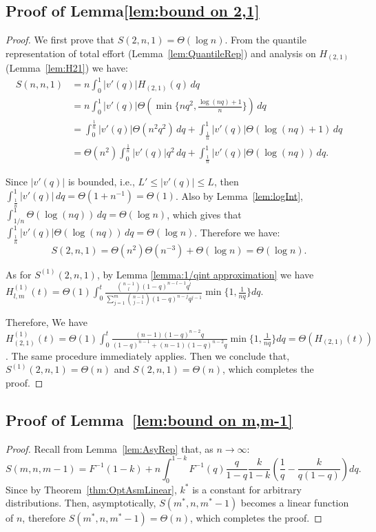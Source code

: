 \subsection*{Proof of Lemma\ref{lem:bound on 2,1}}
\begin{proof}
    We first prove that $S(2,n,1) = \Theta(\log n).$ From the quantile representation of total effort (Lemma~\ref{lem:QuantileRep}) and analysis on $H_{(2,1)}$ (Lemma~\ref{lem:H21}) we have:
    \[
    \begin{aligned}
        S(n,n,1) & = n\int_0^1|v'(q)|H_{(2,1)}(q)\,dq \\
        & = n\int_0^1|v'(q)| \Theta(\min\{nq^2,\frac{\log(nq)+1}{n}\})\, dq \\
        &= \int_{0}^{\frac{1}{n}}|v'(q)| \Theta(n^2q^2)\, dq+\int_{\frac{1}{n}}^{1}|v'(q)| \Theta(\log(nq)+1)\, dq \\
        &= \Theta(n^2)\int_{0}^{\frac{1}{n}}|v'(q)|q^2\, dq+\int_{\frac{1}{n}}^{1}|v'(q)|\Theta(\log(nq))\, dq.
    \end{aligned}
    \]
    
    Since $|v'(q)|$ is bounded, i.e., $L'\leq|v'(q)|\leq L$, then $\int_{\frac{1}{n}}^{1}|v'(q)|\, dq = \Theta(1+n^{-1}) = \Theta(1)$. Also by Lemma~\ref{lem:logInt}, \(\int_{1/n}^{1} \Theta(\log(nq)) \, dq = \Theta(\log n)\), which gives that $\int_{\frac{1}{n}}^{1}|v'(q)|\Theta(\log(nq))\, dq=\Theta(\log n)$. Therefore we have:
    \[
    S(2,n,1)= \Theta(n^{2})\Theta(n^{-3})+\Theta(\log n)=\Theta(\log n).
    \]

    As for $S^{(1)}(2,n,1)$, by Lemma \ref{lemma:1/qint approximation} we have $H_{l,m}^{(1)}(t)=\Theta(1)\int_0^t\frac{\binom{n-1}{l}(1-q)^{n-l-1}q^{l}}{\sum_{j=1}^{m}\binom{n-1}{j-1}(1-q)^{n-j}q^{j-1}}\min\{1,\frac{1}{nq}\}dq$.

    Therefore, We have $H_{(2,1)}^{(1)}(t)=\Theta(1)\int_0^t\frac{(n-1)(1-q)^{n-2}q}{(1-q)^{n-1}+(n-1)(1-q)^{n-2}q}\min\{1,\frac{1}{nq}\}dq = \Theta(H_{(2,1)}(t))$. The same procedure immediately applies. Then we conclude that, $S^{(1)}(2,n,1)=\Theta(n)$ and $S(2,n,1)=\Theta(n)$, which completes the proof.
\end{proof}


\subsection*{Proof of Lemma~\ref{lem:bound on m,m-1}}
\begin{proof}
Recall from Lemma~\ref{lem:AsyRep} that, as $n\to \infty$:
\[
S(m,n,m-1)=F^{-1}(1-k)+n\int_0^{1-k}F^{-1}(q)\frac{q}{1-q}\frac{k}{1-k}(\frac{1}{q}-\frac{k}{q(1-q)})dq.
\]
Since by Theorem~\ref{thm:OptAsmLinear}, $k^*$ is a constant for arbitrary distributions. Then, asymptotically, $S(m^*,n,m^*-1)$ becomes a linear function of $n$, therefore $S(m^*,n,m^*-1)=\Theta(n)$, which completes the proof.
\end{proof}

